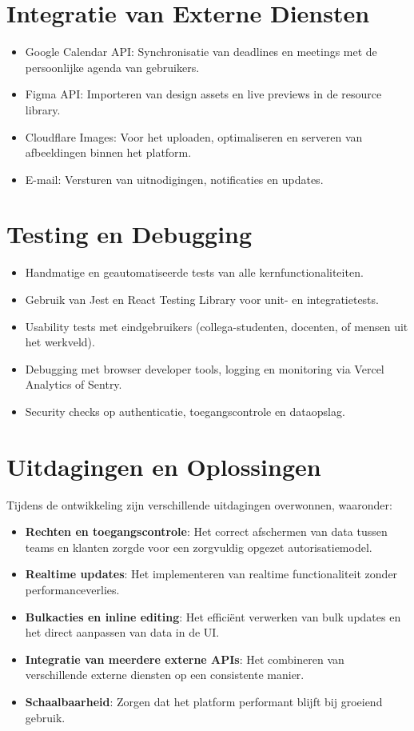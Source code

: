 \section{Integratie van Externe Diensten}
\label{sec:integraties}

\begin{itemize}
    \item Google Calendar API: Synchronisatie van deadlines en meetings met de persoonlijke agenda van gebruikers.
    \item Figma API: Importeren van design assets en live previews in de resource library.
    \item Cloudflare Images: Voor het uploaden, optimaliseren en serveren van afbeeldingen binnen het platform.
    \item E-mail: Versturen van uitnodigingen, notificaties en updates.
\end{itemize}

\section{Testing en Debugging}
\label{sec:testing-debugging}

\begin{itemize}
    \item Handmatige en geautomatiseerde tests van alle kernfunctionaliteiten.
    \item Gebruik van Jest en React Testing Library voor unit- en integratietests.
    \item Usability tests met eindgebruikers (collega-studenten, docenten, of mensen uit het werkveld).
    \item Debugging met browser developer tools, logging en monitoring via Vercel Analytics of Sentry.
    \item Security checks op authenticatie, toegangscontrole en dataopslag.
\end{itemize}

\section{Uitdagingen en Oplossingen}
\label{sec:uitdagingen}

Tijdens de ontwikkeling zijn verschillende uitdagingen overwonnen, waaronder:
\begin{itemize}
    \item \textbf{Rechten en toegangscontrole}: Het correct afschermen van data tussen teams en klanten zorgde voor een zorgvuldig opgezet autorisatiemodel.
    \item \textbf{Realtime updates}: Het implementeren van realtime functionaliteit zonder performanceverlies.
    \item \textbf{Bulkacties en inline editing}: Het efficiënt verwerken van bulk updates en het direct aanpassen van data in de UI.
    \item \textbf{Integratie van meerdere externe APIs}: Het combineren van verschillende externe diensten op een consistente manier.
    \item \textbf{Schaalbaarheid}: Zorgen dat het platform performant blijft bij groeiend gebruik.
\end{itemize}

